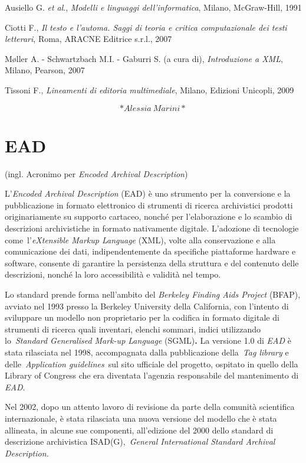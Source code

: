 \documentclass[
  b5paper,
  twoside,
  12pt,
  chapterprefix=false,
  bibliography=totocnumbered,
  parskip=false]{scrbook}
\begin{document}
Ausiello G. \emph{et al}., \emph{Modelli e linguaggi dell'informatica}, Milano,
McGraw-Hill, 1991

Ciotti F., \emph{Il testo e l'automa. Saggi di teoria e critica
computazionale dei testi letterari}, Roma, ARACNE Editrice s.r.l., 2007

Møller A. - Schwartzbach M.I. - Gaburri S. (a cura di), \emph{Introduzione a
XML}, Milano, Pearson, 2007

Tissoni F., \emph{Lineamenti di editoria multimediale}, Milano, Edizioni
Unicopli, 2009

\[*Alessia~Marini*\]

\hypertarget{ead}{%
\chapter{EAD}\label{ead}}

(ingl. Acronimo per \emph{Encoded Archival Description})

L'\emph{Encoded Archival Description} (EAD) è uno strumento per la
conversione e la pubblicazione in formato elettronico di strumenti di
ricerca archivistici prodotti originariamente su supporto cartaceo,
nonché per l'elaborazione e lo scambio di descrizioni archivistiche in
formato nativamente digitale. L'adozione di tecnologie
come~l'\emph{eXtensible Markup Language} (XML), volte alla conservazione e
alla comunicazione dei dati, indipendentemente da specifiche piattaforme
hardware e software, consente di garantire la persistenza della
struttura e del contenuto delle descrizioni, nonché la loro
accessibilità e validità nel tempo.

Lo standard prende forma nell'ambito del \emph{Berkeley Finding Aids
Project} (BFAP), avviato nel 1993 presso la Berkeley University della
California, con l'intento di sviluppare un modello non proprietario per
la codifica in formato digitale di strumenti di ricerca quali inventari,
elenchi sommari, indici utilizzando lo~\emph{Standard Generalised Mark-up
Language} (SGML)\textbf{.} La versione 1.0 di \emph{EAD} è stata rilasciata nel
1998, accompagnata dalla pubblicazione della~\emph{Tag library} e
delle~\emph{Application guidelines}~sul sito ufficiale del progetto, ospitato
in quello della Library of Congress che era diventata l'agenzia
responsabile del mantenimento di \emph{EAD}.

Nel 2002, dopo un attento lavoro di revisione da parte della comunità
scientifica internazionale, è stata rilasciata una nuova versione del
modello che è stata allineata, in alcune sue componenti, all'edizione
del 2000 dello standard di descrizione archivistica ISAD(G),~\emph{General
International Standard Archival Description.}
\end{document}
